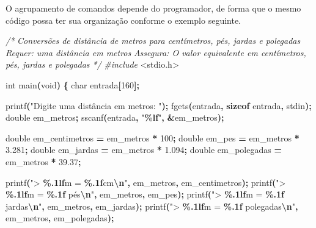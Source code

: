 \documentclass[
  11pt,
  a4paper,
]{scrbook}
\newenvironment{Shaded}{\begin{snugshade}}{\end{snugshade}}
\newcommand{\CommentTok}[1]{\textcolor[rgb]{0.56,0.35,0.01}{\textit{#1}}}
\newcommand{\DataTypeTok}[1]{\textcolor[rgb]{0.13,0.29,0.53}{#1}}
\newcommand{\DecValTok}[1]{\textcolor[rgb]{0.00,0.00,0.81}{#1}}
\newcommand{\FloatTok}[1]{\textcolor[rgb]{0.00,0.00,0.81}{#1}}
\newcommand{\ImportTok}[1]{#1}
\newcommand{\KeywordTok}[1]{\textcolor[rgb]{0.13,0.29,0.53}{\textbf{#1}}}
\newcommand{\NormalTok}[1]{#1}
\newcommand{\OperatorTok}[1]{\textcolor[rgb]{0.81,0.36,0.00}{\textbf{#1}}}
\newcommand{\PreprocessorTok}[1]{\textcolor[rgb]{0.56,0.35,0.01}{\textit{#1}}}
\newcommand{\SpecialCharTok}[1]{\textcolor[rgb]{0.81,0.36,0.00}{\textbf{#1}}}
\newcommand{\StringTok}[1]{\textcolor[rgb]{0.31,0.60,0.02}{#1}}
\begin{document}
O agrupamento de comandos depende do programador, de forma que o mesmo
código possa ter sua organização conforme o exemplo seguinte.

\begin{Shaded}
\begin{Highlighting}[]
\CommentTok{/*}
\CommentTok{Conversões de distância de metros para centímetros, pés, jardas e polegadas}
\CommentTok{Requer: uma distância em metros}
\CommentTok{Assegura: O valor equivalente em centímetros, pés, jardas e polegadas}
\CommentTok{*/}
\PreprocessorTok{\#include }\ImportTok{\textless{}stdio.h\textgreater{}}

\DataTypeTok{int}\NormalTok{ main}\OperatorTok{(}\DataTypeTok{void}\OperatorTok{)} \OperatorTok{\{}
    \DataTypeTok{char}\NormalTok{ entrada}\OperatorTok{[}\DecValTok{160}\OperatorTok{];}

\NormalTok{    printf}\OperatorTok{(}\StringTok{"Digite uma distância em metros: "}\OperatorTok{);}
\NormalTok{    fgets}\OperatorTok{(}\NormalTok{entrada}\OperatorTok{,} \KeywordTok{sizeof}\NormalTok{ entrada}\OperatorTok{,}\NormalTok{ stdin}\OperatorTok{);}
    \DataTypeTok{double}\NormalTok{ em\_metros}\OperatorTok{;}
\NormalTok{    sscanf}\OperatorTok{(}\NormalTok{entrada}\OperatorTok{,} \StringTok{"}\SpecialCharTok{\%lf}\StringTok{"}\OperatorTok{,} \OperatorTok{\&}\NormalTok{em\_metros}\OperatorTok{);}

    \DataTypeTok{double}\NormalTok{ em\_centimetros }\OperatorTok{=}\NormalTok{ em\_metros }\OperatorTok{*} \DecValTok{100}\OperatorTok{;}
    \DataTypeTok{double}\NormalTok{ em\_pes }\OperatorTok{=}\NormalTok{ em\_metros }\OperatorTok{*} \FloatTok{3.281}\OperatorTok{;}
    \DataTypeTok{double}\NormalTok{ em\_jardas }\OperatorTok{=}\NormalTok{ em\_metros }\OperatorTok{*} \FloatTok{1.094}\OperatorTok{;}
    \DataTypeTok{double}\NormalTok{ em\_polegadas }\OperatorTok{=}\NormalTok{ em\_metros }\OperatorTok{*} \FloatTok{39.37}\OperatorTok{;}
 
\NormalTok{    printf}\OperatorTok{(}\StringTok{"\textgreater{} }\SpecialCharTok{\%.1lf}\StringTok{m = }\SpecialCharTok{\%.1f}\StringTok{cm}\SpecialCharTok{\textbackslash{}n}\StringTok{"}\OperatorTok{,}\NormalTok{ em\_metros}\OperatorTok{,}\NormalTok{ em\_centimetros}\OperatorTok{);}
\NormalTok{    printf}\OperatorTok{(}\StringTok{"\textgreater{} }\SpecialCharTok{\%.1lf}\StringTok{m = }\SpecialCharTok{\%.1f}\StringTok{ pés}\SpecialCharTok{\textbackslash{}n}\StringTok{"}\OperatorTok{,}\NormalTok{ em\_metros}\OperatorTok{,}\NormalTok{ em\_pes}\OperatorTok{);}
\NormalTok{    printf}\OperatorTok{(}\StringTok{"\textgreater{} }\SpecialCharTok{\%.1lf}\StringTok{m = }\SpecialCharTok{\%.1f}\StringTok{ jardas}\SpecialCharTok{\textbackslash{}n}\StringTok{"}\OperatorTok{,}\NormalTok{ em\_metros}\OperatorTok{,}\NormalTok{ em\_jardas}\OperatorTok{);}
\NormalTok{    printf}\OperatorTok{(}\StringTok{"\textgreater{} }\SpecialCharTok{\%.1lf}\StringTok{m = }\SpecialCharTok{\%.1f}\StringTok{ polegadas}\SpecialCharTok{\textbackslash{}n}\StringTok{"}\OperatorTok{,}\NormalTok{ em\_metros}\OperatorTok{,}\NormalTok{ em\_polegadas}\OperatorTok{);}


\end{Highlighting}
\end{Shaded}
\end{document}
